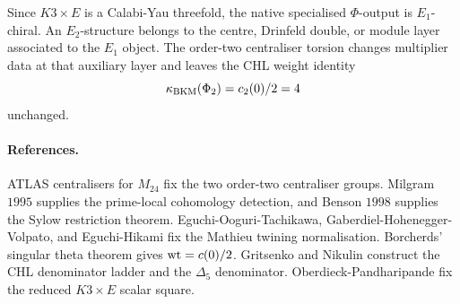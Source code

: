 Since \(K3\times E\) is a Calabi-Yau threefold, the native specialised
\(\Phi\)-output is \(E_1\)-chiral.  An \(E_2\)-structure belongs to the
centre, Drinfeld double, or module layer associated to the \(E_1\)
object.  The order-two centraliser torsion changes multiplier data at
that auxiliary layer and leaves the CHL weight identity
\[
 \kappa_{\mathrm{BKM}}(\Phi_2)=c_2(0)/2=4
\]
unchanged.

\paragraph{References.}
ATLAS centralisers for \(M_{24}\) fix the two order-two centraliser
groups.  Milgram \(1995\) supplies the prime-local cohomology
detection, and Benson \(1998\) supplies the Sylow restriction theorem.
Eguchi-Ooguri-Tachikawa, Gaberdiel-Hohenegger-Volpato, and
Eguchi-Hikami fix the Mathieu twining normalisation.  Borcherds'
singular theta theorem gives \(\operatorname{wt}=c(0)/2\).  Gritsenko and Nikulin
construct the CHL denominator ladder and the \(\Delta_5\) denominator.
Oberdieck-Pandharipande fix the reduced \(K3\times E\) scalar square.

